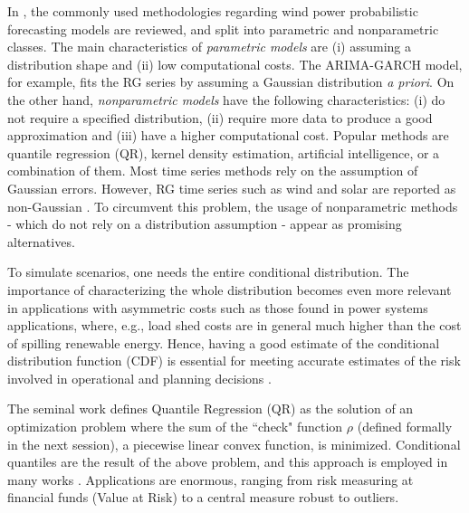 In \cite{zhang_review_2014}, the commonly used methodologies regarding wind power probabilistic forecasting models are reviewed, and split into parametric and nonparametric classes. The main characteristics of \emph{parametric models} are (i) assuming a distribution shape and (ii) low computational costs. The ARIMA-GARCH model, for example, fits the RG series by assuming a Gaussian distribution \emph{a priori}. On the other hand, \emph{nonparametric models} have the following characteristics: (i) do not require a specified distribution, (ii) require more data to produce a good approximation and (iii) have a higher computational cost. Popular methods are quantile regression (QR), kernel density estimation,  artificial intelligence, or a combination of them.
Most time series methods rely on the assumption of Gaussian errors. However, RG time series such as wind and solar are reported as non-Gaussian \cite{bessa2012time,jeon2012using,taylor2015forecasting,Wan2017}. To circumvent this problem, the usage of nonparametric methods - which do not rely on a distribution assumption - appear as promising alternatives. 

To simulate scenarios, one needs the entire conditional distribution. The importance of characterizing the whole distribution becomes even more relevant in applications with asymmetric costs such as those found in power systems applications, where, e.g., load shed costs are in general much higher than the cost of spilling renewable energy. Hence, having a good estimate of the conditional distribution function (CDF) is essential for meeting accurate estimates of the risk involved in operational and planning decisions \cite{Fanzeres2015}. 


The seminal work \cite{koenker1978regression} defines Quantile Regression (QR) as the solution of an optimization problem where the sum of the ``check" function $\rho$ (defined formally in the next session), a piecewise linear convex function, is minimized. Conditional quantiles are the result of the above problem, and this approach is employed in many works \cite{chao_quantile_2012,li_quantile_2007,bosch_convergent_nodate,gallego2016line,moller_time-adaptive_2008,nielsen2006,bremnes_probabilistic_2004,wan_direct_2017}. Applications are enormous, ranging from risk measuring at financial funds (Value at Risk) to a central measure robust to outliers.




